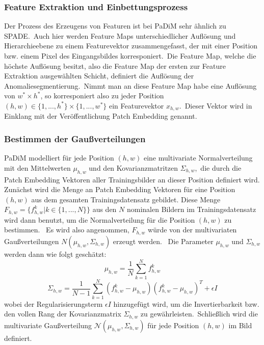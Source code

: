 \subsubsection*{Feature Extraktion und Einbettungsprozess}
Der Prozess des Erzeugens von Featuren ist bei PaDiM sehr ähnlich zu SPADE.\
Auch hier werden Feature Maps unterschiedlicher Auflösung und Hierarchieebene zu einem Featurevektor zusammengefasst, der mit einer Position bzw. einem Pixel des Eingangsbildes korresponiert.\
Die Feature Map, welche die höchste Auflösung besitzt, also die Feature Map der ersten zur Feature Extraktion ausgewählten Schicht, definiert die Auflösung der Anomaliesegmentierung.\
Nimmt man an diese Feature Map habe eine Auflösung von $w^{*}\times h^{*}$, so korresponiert also zu jeder Position $(h,w)\in \{1,...,h^{*}\}\times \{1,...,w^{*}\}$ ein Featurevektor $x_{h,w}$.\
Dieser Vektor wird in Einklang mit der Veröffentlichung \glqq Patch Embedding\grqq{} genannt.\\
\subsubsection{Bestimmen der Gaußverteilungen}
PaDiM modelliert für jede Position $(h,w)$ eine multivariate Normalverteilung mit den Mittelwerten $\mu_{h,w}$ und den Kovarianzmatritzen $\Sigma_{h,w}$,\
die durch die Patch Embedding Vektoren aller Trainingsbilder an dieser Position definiert wird.\\
Zunächst wird die Menge an Patch Embedding Vektoren für eine Position $(h,w)$ aus dem gesamten Trainingsdatensatz gebildet. Diese Menge \
$F_{h,w} = \{ {f_{h,w}^{k} | k\in \{1,...,N\}} \}$ aus den $N$ nominalen Bildern im Trainingsdatensatz wird dann benutzt, um die Normalverteilung für die Position $(h,w)$ zu bestimmen. \
Es wird also angenommen, $F_{h,w}$ würde von der multivariaten Gaußverteilungen $N(\mu_{h,w}, \Sigma_{h,w})$ erzeugt werden. \
Die Parameter $\mu_{h,w}$ und $\Sigma_{h,w}$ werden dann wie folgt geschätzt: \
$$
\mu_{h,w} = \frac{1}{N} \sum_{k=1}^{N} f_{h,w}^{k}
$$
$$
\Sigma_{h,w} = \frac{1}{N-1} \sum_{k=1}^{N} (f_{h,w}^{k} - \mu_{h,w})(f_{h,w}^{k} - \mu_{h,w})^{T} + \epsilon I
$$
wobei der Regularisierungsterm $\epsilon I$ hinzugefügt wird, um die Invertierbarkeit bzw. den vollen Rang der Kovarianzmatrix $\Sigma_{h,w}$ zu gewährleisten.\
Schließlich wird die multivariate Gaußverteilung $\mathcal{N}(\mu_{h,w}, \Sigma_{h,w})$ für jede Position $(h,w)$ im Bild definiert.\
